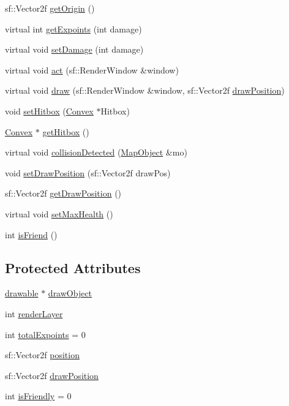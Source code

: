 \begin{DoxyCompactItemize}
\item 
sf\+::\+Vector2f \hyperlink{class_map_object_a37b6bc003f67eac65280c1630e40ecff}{get\+Origin} ()
\item 
virtual int \hyperlink{class_map_object_a8d20d7a2a24f47f48c9200b5afc0ded1}{get\+Expoints} (int damage)
\item 
virtual void \hyperlink{class_map_object_a8aaf83927a9f0a59743dc405a36ae84d}{set\+Damage} (int damage)
\item 
virtual void \hyperlink{class_map_object_a1063ae3e2974c932e2a09d9823d891ed}{act} (sf\+::\+Render\+Window \&window)
\item 
virtual void \hyperlink{class_map_object_acb5c1629356cd92042761748ed10fa28}{draw} (sf\+::\+Render\+Window \&window, sf\+::\+Vector2f \hyperlink{class_map_object_a3f383fa967b67989a1d30f8f9ff73936}{draw\+Position})
\item 
void \hyperlink{class_map_object_a6f039817967b63eef60a7079a24ff5b1}{set\+Hitbox} (\hyperlink{class_convex}{Convex} $\ast$Hitbox)
\item 
\hyperlink{class_convex}{Convex} $\ast$ \hyperlink{class_map_object_aba53d81e39da359ac51c2b391fb94dfe}{get\+Hitbox} ()
\item 
virtual void \hyperlink{class_map_object_a577dfea7d356638ee0a5f673bbd83b79}{collision\+Detected} (\hyperlink{class_map_object}{Map\+Object} \&mo)
\item 
void \hyperlink{class_map_object_a43131a930ae890950e2027340ffe6aca}{set\+Draw\+Position} (sf\+::\+Vector2f draw\+Pos)
\item 
sf\+::\+Vector2f \hyperlink{class_map_object_a8090ff0579451a195de674e23c9251e8}{get\+Draw\+Position} ()
\item 
virtual void \hyperlink{class_map_object_a12ef2d2a5b6673a46e560353b2c44b1e}{set\+Max\+Health} ()
\item 
int \hyperlink{class_map_object_ab2c08c54979e8457057f4d2dcdaae0fb}{is\+Friend} ()
\end{DoxyCompactItemize}
\subsection*{Protected Attributes}
\begin{DoxyCompactItemize}
\item 
\hyperlink{classdrawable}{drawable} $\ast$ \hyperlink{class_map_object_a1c65f2eeb4aa3ce941e5a91347441aa9}{draw\+Object}
\item 
int \hyperlink{class_map_object_ac7431860a4ca955dc3db173926be3856}{render\+Layer}
\item 
int \hyperlink{class_map_object_a93598b361b5c86637ae5779146e222da}{total\+Expoints} = 0
\item 
sf\+::\+Vector2f \hyperlink{class_map_object_a00491cbf8e4cbc729ef37e11f3473860}{position}
\item 
sf\+::\+Vector2f \hyperlink{class_map_object_a3f383fa967b67989a1d30f8f9ff73936}{draw\+Position}
\item 
int \hyperlink{class_map_object_a1788c8bf4e3c04bff8c2eba112e46d79}{is\+Friendly} = 0
\end{DoxyCompactItemize}


